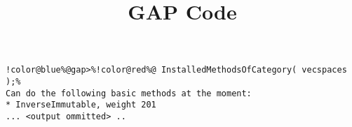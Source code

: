 \documentclass[12pt]{amsart}
\title{GAP Code}
\author{}
\begin{document}
\maketitle

\begin{Verbatim}[commandchars=!@\%,frame=single]
!color@blue%@gap>%!color@red%@ InstalledMethodsOfCategory( vecspaces );%
Can do the following basic methods at the moment:
* InverseImmutable, weight 201
... <output ommitted> ..
\end{Verbatim}
\end{document}
